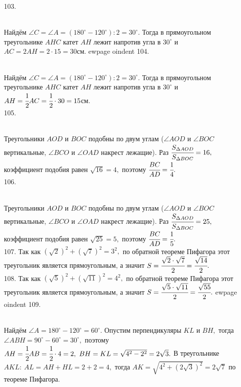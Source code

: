 103. \begin{figure}[ht!]
\end{figure}\\
Найдём $\angle C=\angle A=(180^\circ-120^\circ):2=30^\circ.$ Тогда в прямоугольном треугольнике $AHC$ катет $AH$ лежит напротив угла в $30^\circ$ и $AC=2AH=2\cdot15=30$см.
ewpage
oindent
104. \begin{figure}[ht!]
\end{figure}\\
Найдём $\angle C=\angle A=(180^\circ-120^\circ):2=30^\circ.$ Тогда в прямоугольном треугольнике $AHC$ катет $AH$ лежит напротив угла в $30^\circ$ и
$AH=\cfrac{1}{2}AC=\cfrac{1}{2}\cdot30=15$см.\\
105. \begin{figure}[ht!]
\end{figure}\\
Треугольники $AOD$ и $BOC$ подобны по двум углам ($\angle AOD$ и $\angle BOC$ вертикальные, $\angle BCO$ и $\angle OAD$ накрест лежащие). Раз
$\cfrac{S_{\Delta AOD}}{S_{\Delta BOC}}=16,$ коэффициент подобия равен $\sqrt{16}=4,$ поэтому $\cfrac{BC}{AD}=\cfrac{1}{4}.$\\
106. \begin{figure}[ht!]
\end{figure}\\
Треугольники $AOD$ и $BOC$ подобны по двум углам ($\angle AOD$ и $\angle BOC$ вертикальные, $\angle BCO$ и $\angle OAD$ накрест лежащие). Раз
$\cfrac{S_{\Delta AOD}}{S_{\Delta BOC}}=25,$ коэффициент подобия равен $\sqrt{25}=5,$ поэтому $\cfrac{BC}{AD}=\cfrac{1}{5}.$\\
107. Так как $(\sqrt{2})^2+(\sqrt{7})^2=3^2,$ по обратной теореме Пифагора этот треугольник является прямоугольным, а значит $S=\cfrac{\sqrt{2}\cdot\sqrt{7}}{2}=\cfrac{\sqrt{14}}{2}.$\\
108. Так как $(\sqrt{5})^2+(\sqrt{11})^2=4^2,$ по обратной теореме Пифагора этот треугольник является прямоугольным, а значит $S=\cfrac{\sqrt{5}\cdot\sqrt{11}}{2}=\cfrac{\sqrt{55}}{2}.$
ewpage
oindent
109. \begin{figure}[ht!]
\end{figure}\\
Найдём $\angle A=180^\circ-120^\circ=60^\circ.$ Опустим перпендикуляры $KL$ и $BH,$ тогда $\angle ABH=90^\circ-60^\circ=30^\circ,$ поэтому $AH=\cfrac{1}{2}AB=\cfrac{1}{2}\cdot4=2,\ BH=KL=\sqrt{4^2-2^2}=2\sqrt{3}.$ В треугольнике $AKL:\ AL=AH+HL=2+2=4,$ тогда $AK=\sqrt{4^2+(2\sqrt{3})^2}=2\sqrt{7}$ по теореме Пифагора.\\
